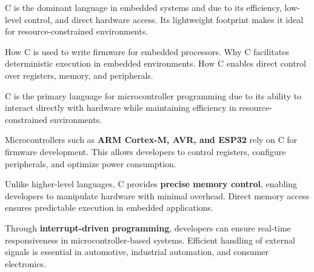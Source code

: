 \begin{NxSSSBox}
	\begin{NxIDBox}
		C is the dominant language in embedded systems and  due to its efficiency, low-level control, and direct hardware access. Its lightweight footprint makes it ideal for resource-constrained environments.
	\end{NxIDBox}
	\begin{NxIDBoxL}
		 How C is used to write firmware for embedded processors.
		 Why C facilitates deterministic execution in embedded environments.
		 How C enables direct control over registers, memory, and peripherals.
	\end{NxIDBoxL}
\end{NxSSSBox}

\begin{NxSSSSBox}
	\begin{NxIDBox}
		C is the primary language for microcontroller programming due to its ability to interact directly with hardware while maintaining efficiency in resource-constrained environments.
	\end{NxIDBox}
	\begin{NxIDBox}
		Microcontrollers such as \textbf{ARM Cortex-M, AVR, and ESP32} rely on C for firmware development. This allows developers to control registers, configure peripherals, and optimize power consumption.
	\end{NxIDBox}
	\begin{NxIDBox}
		Unlike higher-level languages, C provides \textbf{precise memory control}, enabling developers to manipulate hardware with minimal overhead. Direct memory access ensures predictable execution in embedded applications.
	\end{NxIDBox}
	\begin{NxIDBox}
		Through \textbf{interrupt-driven programming}, developers can ensure real-time responsiveness in microcontroller-based systems. Efficient handling of external signals is essential in automotive, industrial automation, and consumer electronics.
	\end{NxIDBox}
\end{NxSSSSBox}

